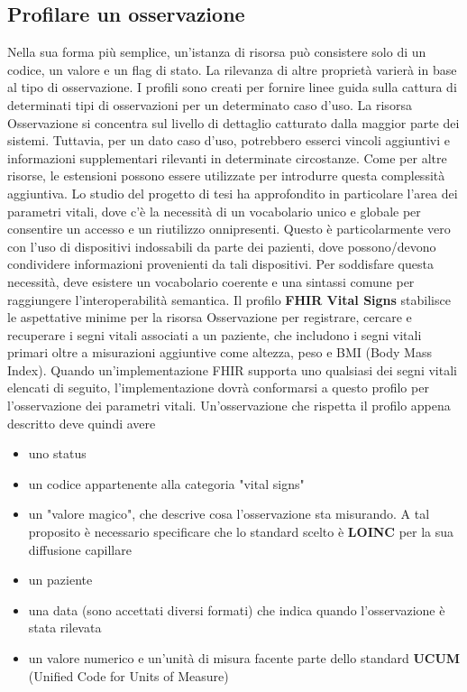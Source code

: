 \documentclass{article}
\begin{document}
\subsection{Profilare un osservazione}
Nella sua forma più semplice, un'istanza di risorsa può consistere solo di un codice, un valore e un flag di stato.
La rilevanza di altre proprietà varierà in base al tipo di osservazione.
I profili sono creati per fornire linee guida sulla cattura di determinati tipi di osservazioni per un determinato caso d'uso.
La risorsa Osservazione si concentra sul livello di dettaglio catturato dalla maggior parte dei sistemi.
Tuttavia, per un dato caso d'uso, potrebbero esserci vincoli aggiuntivi e informazioni supplementari rilevanti in determinate circostanze.
Come per altre risorse, le estensioni possono essere utilizzate per introdurre questa complessità aggiuntiva.
Lo studio del progetto di tesi ha approfondito in particolare l'area dei parametri vitali, dove c'è la necessità di un vocabolario unico
e globale per consentire un accesso e un riutilizzo onnipresenti. Questo è particolarmente vero con l'uso di dispositivi indossabili da
parte dei pazienti, dove possono/devono condividere informazioni provenienti da tali dispositivi. Per soddisfare questa necessità,
deve esistere un vocabolario coerente e una sintassi comune per raggiungere l'interoperabilità semantica.
Il profilo \textbf{FHIR Vital Signs} stabilisce le aspettative minime per la risorsa Osservazione per registrare, cercare e recuperare i segni vitali
associati a un paziente, che includono i segni vitali primari oltre a misurazioni aggiuntive come altezza, peso e BMI (Body Mass Index).
Quando un'implementazione FHIR supporta uno qualsiasi dei segni vitali elencati di seguito, l'implementazione dovrà conformarsi a questo profilo per l'osservazione dei parametri vitali.
Un'osservazione che rispetta il profilo appena descritto deve quindi avere
\begin{itemize}
    \item uno status
    \item un codice appartenente alla categoria "vital signs"
    \item un "valore magico", che descrive cosa l'osservazione sta misurando.
          A tal proposito è necessario specificare che lo standard scelto è \textbf{LOINC} per la sua diffusione capillare
    \item un paziente
    \item una data (sono accettati diversi formati) che indica quando l'osservazione è stata rilevata
    \item un valore numerico e un'unità di misura facente parte dello standard \textbf{UCUM} (Unified Code for Units of Measure)
\end{itemize}
\end{document}
